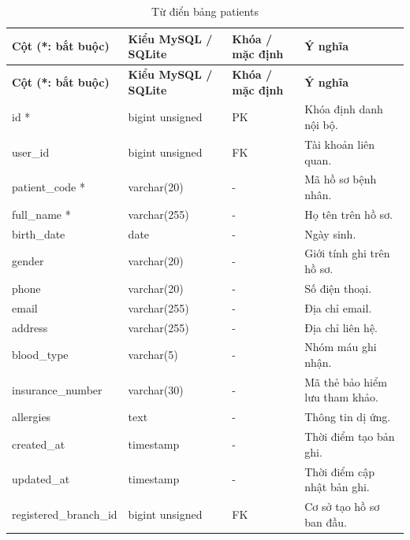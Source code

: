 {\fontsize{10}{12}\selectfont\setlength{\tabcolsep}{3pt}\renewcommand{\arraystretch}{1.12}
\begin{longtable}{@{}L{\textwidth-4.86pt\relax} L{\textwidth-3.96pt\relax} L{\textwidth-2.88pt\relax} L{\textwidth-6.3pt\relax}@{}}
\caption{Từ điển bảng patients}\\
\toprule
\textbf{Cột (*:\allowbreak{} bắt buộc)} & \textbf{Kiểu My\allowbreak{}SQL /\allowbreak{} SQLite} & \textbf{Khóa /\allowbreak{} mặc định} & \textbf{Ý nghĩa}\\\midrule
\endfirsthead
\toprule
\textbf{Cột (*:\allowbreak{} bắt buộc)} & \textbf{Kiểu My\allowbreak{}SQL /\allowbreak{} SQLite} & \textbf{Khóa /\allowbreak{} mặc định} & \textbf{Ý nghĩa}\\\midrule
\endhead
\bottomrule\endlastfoot
id * & bigint unsigned & PK & Khóa định danh nội bộ.\allowbreak{}\\[1pt]
user\_\allowbreak{}id & bigint unsigned & FK & Tài khoản liên quan.\allowbreak{}\\[1pt]
patient\_\allowbreak{}code * & varchar(20) & - & Mã hồ sơ bệnh nhân.\allowbreak{}\\[1pt]
full\_\allowbreak{}name * & varchar(255) & - & Họ tên trên hồ sơ.\allowbreak{}\\[1pt]
birth\_\allowbreak{}date & date & - & Ngày sinh.\allowbreak{}\\[1pt]
gender & varchar(20) & - & Giới tính ghi trên hồ sơ.\allowbreak{}\\[1pt]
phone & varchar(20) & - & Số điện thoại.\allowbreak{}\\[1pt]
email & varchar(255) & - & Địa chỉ email.\allowbreak{}\\[1pt]
address & varchar(255) & - & Địa chỉ liên hệ.\allowbreak{}\\[1pt]
blood\_\allowbreak{}type & varchar(5) & - & Nhóm máu ghi nhận.\allowbreak{}\\[1pt]
insurance\_\allowbreak{}number & varchar(30) & - & Mã thẻ bảo hiểm lưu tham khảo.\allowbreak{}\\[1pt]
allergies & text & - & Thông tin dị ứng.\allowbreak{}\\[1pt]
created\_\allowbreak{}at & timestamp & - & Thời điểm tạo bản ghi.\allowbreak{}\\[1pt]
updated\_\allowbreak{}at & timestamp & - & Thời điểm cập nhật bản ghi.\allowbreak{}\\[1pt]
registered\_\allowbreak{}branch\_\allowbreak{}id & bigint unsigned & FK & Cơ sở tạo hồ sơ ban đầu.\allowbreak{}\\[1pt]

\end{longtable}}
